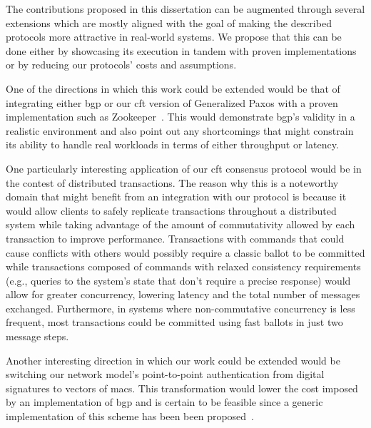The contributions proposed in this dissertation can be augmented through several extensions which are mostly aligned with the goal of making the described protocols more attractive in real-world systems. We propose that this can be done either by showcasing its execution in tandem with proven implementations or by reducing our protocols' costs and assumptions.\par
One of the directions in which this work could be extended would be that of integrating either \acrshort{bgp} or our \acrshort{cft} version of Generalized Paxos with a proven implementation such as Zookeeper~\cite{Hunt2010}. This would demonstrate \acrshort{bgp}'s validity in a realistic environment and also point out any shortcomings that might constrain its ability to handle real workloads in terms of either throughput or latency. \par
One particularly interesting application of our \acrshort{cft} consensus protocol would be in the contest of distributed transactions. The reason why this is a noteworthy domain that might benefit from an integration with our protocol is because it would allow clients to safely replicate transactions throughout a distributed system while taking advantage of the amount of commutativity allowed by each transaction to improve performance. Transactions with commands that could cause conflicts with others would possibly require a classic ballot to be committed while transactions composed of commands with relaxed consistency requirements (e.g., queries to the system's state that don't require a precise response) would allow for greater concurrency, lowering latency and the total number of messages exchanged. Furthermore, in systems where non-commutative concurrency is less frequent, most transactions could be committed using fast ballots in just two message steps. \par
Another interesting direction in which our work could be extended would be switching our network model's point-to-point authentication from digital signatures to vectors of \acrfull{macs}. This transformation would lower the cost imposed by an implementation of \acrshort{bgp} and is certain to be feasible since a generic implementation of this scheme has been been proposed~\cite{Aiyer:2008}.